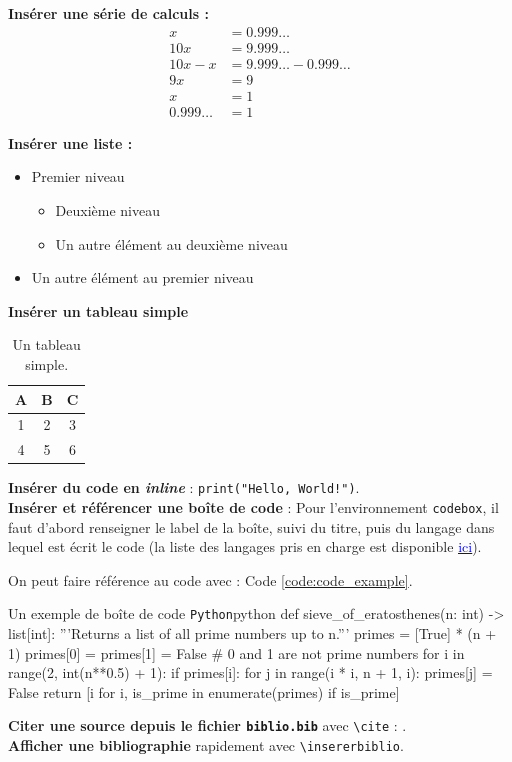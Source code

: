 \documentclass{rapportECL2024}
\begin{document}
\textbf{Insérer une série de calculs :}
\begin{align*}
    x &= 0.999\ldots \\
    10x &= 9.999\ldots \\
    10x - x &= 9.999\ldots - 0.999\ldots \\
    9x &= 9 \\
    x &= 1 \\
    0.999\ldots &= 1
\end{align*}


\textbf{Insérer une liste :}
\begin{itemize}
    \item Premier niveau
    \begin{itemize}
        \item Deuxième niveau
        \item Un autre élément au deuxième niveau
    \end{itemize}
    \item Un autre élément au premier niveau
\end{itemize}


\textbf{Insérer un tableau simple} \\
\begin{table}[H]
    \centering
    \begin{tabular}{|c|c|c|}
        \hline
        A & B & C \\
        \hline
        1 & 2 & 3 \\
        4 & 5 & 6 \\
        \hline
    \end{tabular}
    \caption{Un tableau simple.}
    \label{tab:tableau_simple}
\end{table}


\textbf{Insérer du code en \textit{inline}} : \texttt{print("Hello, World!")}.\\


\textbf{Insérer et référencer une boîte de code} : Pour l'environnement \texttt{codebox}, il faut d'abord renseigner le label de la boîte, suivi du titre, puis du langage dans lequel est écrit le code (la liste des langages pris en charge est disponible \href{https://www.overleaf.com/learn/latex/Code_Highlighting_with_minted#:~:text=Main%20supported%20programming%20languages%20and%20configuration%20files}{\textcolor{blue}{\underline{ici}}}). 

On peut faire référence au code avec : Code \ref{code:code_example}.

\begin{codebox}{Un exemple de boîte de code \texttt{Python}}{python}
def sieve_of_eratosthenes(n: int) -> list[int]:
    '''Returns a list of all prime numbers up to n.'''
    primes = [True] * (n + 1)
    primes[0] = primes[1] = False  # 0 and 1 are not prime numbers
    for i in range(2, int(n**0.5) + 1):
        if primes[i]:
            for j in range(i * i, n + 1, i):
                primes[j] = False
    return [i for i, is_prime in enumerate(primes) if is_prime]
\end{codebox}


\textbf{Citer une source depuis le fichier \texttt{biblio.bib}} avec \texttt{\textbackslash cite} : \cite{exemple_de_source}.\\


\textbf{Afficher une bibliographie} rapidement avec \texttt{\textbackslash insererbiblio}.

\insererbiblio 
\end{document}
